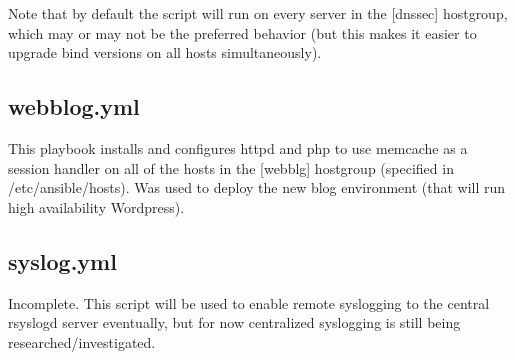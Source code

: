 \documentclass[a4paper]{article}
\begin{document}
Note that by default the script will run on every server in the [dnssec] hostgroup, which may or may not be the preferred behavior (but this makes it easier to upgrade bind versions on all hosts simultaneously).

\subsection{webblog.yml}

This playbook installs and configures httpd and php to use memcache as a session handler on all of the hosts in the [webblg] hostgroup (specified in /etc/ansible/hosts). Was used to deploy the new blog environment (that will run high availability Wordpress).

\subsection{syslog.yml}

Incomplete. This script will be used to enable remote syslogging to the central rsyslogd server eventually, but for now centralized syslogging is still being researched/investigated.
\end{document}
